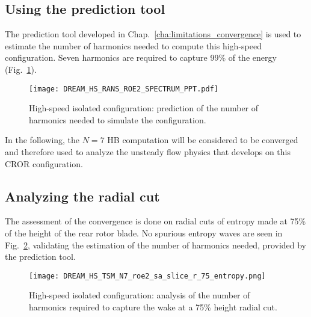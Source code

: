 
\subsection{Using the prediction tool}
\label{sub:dream_hs_conv_hb_prediction_tool}

The prediction tool developed in Chap.~\ref{cha:limitations_convergence}
is used to estimate the number of harmonics needed to compute
this high-speed configuration.
Seven harmonics are required to capture 99\% of the energy
(Fig.~\ref{fig:DREAM_HS_RANS_ROE2_SPECTRUM_PPT}).
\begin{figure}[htp]
  \centering
  \texttt{[image: DREAM\_HS\_RANS\_ROE2\_SPECTRUM\_PPT.pdf]}
  \caption{High-speed isolated configuration: prediction of the number
  of harmonics needed to simulate the configuration.}
  \label{fig:DREAM_HS_RANS_ROE2_SPECTRUM_PPT}
\end{figure}

In the following, the $N=7$ HB computation will be
considered to be converged and therefore used to 
analyze the unsteady flow physics that develops on 
this CROR configuration.

\subsection{Analyzing the radial cut}
\label{sub:dream_hs_conv_hb_slice_r}

The assessment of the convergence is done on radial cuts
of entropy made at 75\% of the height of the rear rotor blade. 
No spurious entropy waves are seen
in Fig.~\ref{fig:dream_hs_hb_slice_r_conv}, validating the
estimation of the number of harmonics needed, provided
by the prediction tool.
\begin{figure}[htp]
  \centering
  \texttt{[image: DREAM\_HS\_TSM\_N7\_roe2\_sa\_slice\_r\_75\_entropy.png]}
  \caption{High-speed isolated configuration: analysis of the number of harmonics
  required to capture the wake at a 75\% height radial cut.}
  \label{fig:dream_hs_hb_slice_r_conv}
\end{figure}
